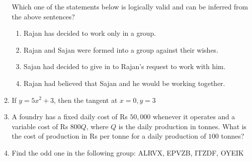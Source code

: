 \documentclass[a4paper,10pt]{article}
\begin{document}
\begin{enumerate}
    Which one of the statements below is logically valid and can be inferred from the above sentences?
    
    \hfill{}
    \begin{enumerate}
        \item Rajan has decided to work only in a group.
        \item Rajan and Sajan were formed into a group against their wishes.
        \item Sajan had decided to give in to Rajan's request to work with him.
        \item Rajan had believed that Sajan and he would be working together.
    \end{enumerate}

    \item If $y = 5x^2 + 3$, then the tangent at $x = 0, y = 3$
    
    \hfill{}
    \begin{enumerate}
    \end{enumerate}

    \item A foundry has a fixed daily cost of Rs $50,000$ whenever it operates and a variable cost of Rs $800Q$, where $Q$ is the daily production in tonnes. What is the cost of production in Rs per tonne for a daily production of $100$ tonnes?
    
    \hfill{}

    \item Find the odd one in the following group: ALRVX, EPVZB, ITZDF, OYEIK
    
    \hfill{}
    \begin{enumerate}
    \end{enumerate}


\end{enumerate}
\end{document}
